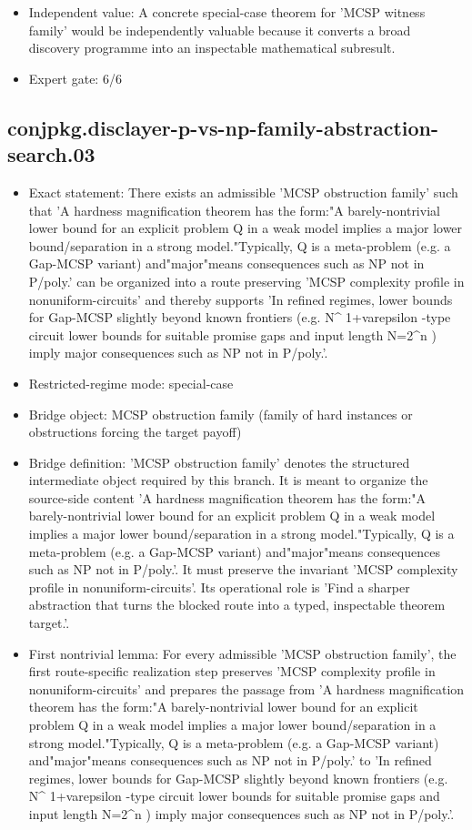 \documentclass[11pt]{article}
\begin{document}
\begin{itemize}
\item Independent value: A concrete special-case theorem for 'MCSP witness family' would be independently valuable because it converts a broad discovery programme into an inspectable mathematical subresult.
\item Expert gate: 6/6
\end{itemize}

\subsection*{conjpkg.disclayer-p-vs-np-family-abstraction-search.03}
\begin{itemize}
\item Exact statement: There exists an admissible 'MCSP obstruction family' such that 'A hardness magnification theorem has the form:"A barely-nontrivial lower bound for an explicit problem Q in a weak model implies a major lower bound/separation in a strong model."Typically, Q is a meta-problem (e.g. a Gap-MCSP variant) and"major"means consequences such as NP not in P/poly.' can be organized into a route preserving 'MCSP complexity profile in nonuniform-circuits' and thereby supports 'In refined regimes, lower bounds for Gap-MCSP slightly beyond known frontiers (e.g. N\textasciicircum{} 1+varepsilon -type circuit lower bounds for suitable promise gaps and input length N=2\textasciicircum{}n ) imply major consequences such as NP not in P/poly.'.
\item Restricted-regime mode: special-case
\item Bridge object: MCSP obstruction family (family of hard instances or obstructions forcing the target payoff)
\item Bridge definition: 'MCSP obstruction family' denotes the structured intermediate object required by this branch. It is meant to organize the source-side content 'A hardness magnification theorem has the form:"A barely-nontrivial lower bound for an explicit problem Q in a weak model implies a major lower bound/separation in a strong model."Typically, Q is a meta-problem (e.g. a Gap-MCSP variant) and"major"means consequences such as NP not in P/poly.'. It must preserve the invariant 'MCSP complexity profile in nonuniform-circuits'. Its operational role is 'Find a sharper abstraction that turns the blocked route into a typed, inspectable theorem target.'.
\item First nontrivial lemma: For every admissible 'MCSP obstruction family', the first route-specific realization step preserves 'MCSP complexity profile in nonuniform-circuits' and prepares the passage from 'A hardness magnification theorem has the form:"A barely-nontrivial lower bound for an explicit problem Q in a weak model implies a major lower bound/separation in a strong model."Typically, Q is a meta-problem (e.g. a Gap-MCSP variant) and"major"means consequences such as NP not in P/poly.' to 'In refined regimes, lower bounds for Gap-MCSP slightly beyond known frontiers (e.g. N\textasciicircum{} 1+varepsilon -type circuit lower bounds for suitable promise gaps and input length N=2\textasciicircum{}n ) imply major consequences such as NP not in P/poly.'.

\end{itemize}
\end{document}
